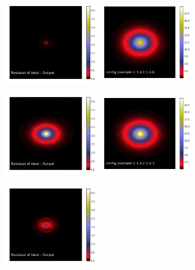 \documentclass[12pt,preprint]{aastex6}
\begin{document}
\begin{figure}[!htbp]
\includegraphics[height=47mm,width=49mm]{f3k.png}
\includegraphics[height=47mm,width=49mm]{f3l.png}
\includegraphics[height=47mm,width=49mm]{f3m.png}
\includegraphics[height=47mm,width=49mm]{f3n.png}
\includegraphics[height=47mm,width=49mm]{f3o.png}

\end{figure}
\end{document}
